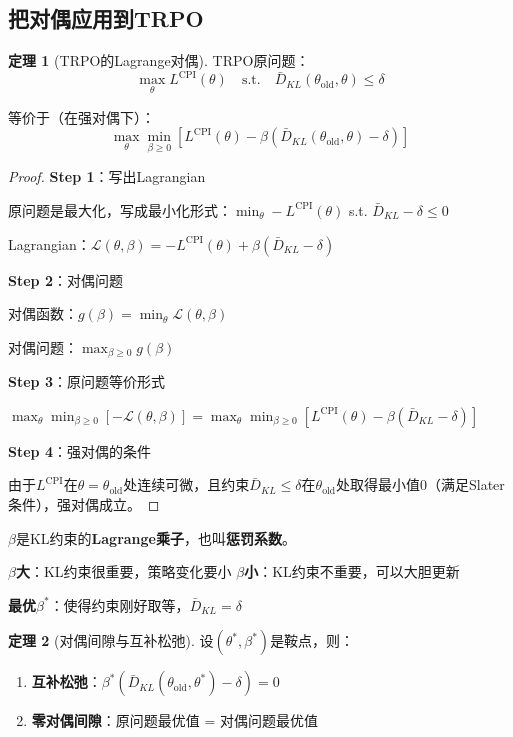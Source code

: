 \documentclass[11pt,a4paper]{article}
\theoremstyle{definition}
\newtheorem{theorem}{定理}[section]
\begin{document}
\subsection{把对偶应用到TRPO}

\begin{theorem}[TRPO的Lagrange对偶]
TRPO原问题：
\[
\max_\theta L^{\text{CPI}}(\theta) \quad \text{s.t.} \quad \bar{D}_{KL}(\theta_{\text{old}}, \theta) \leq \delta
\]

等价于（在强对偶下）：
\[
\max_\theta \min_{\beta \geq 0} \left[L^{\text{CPI}}(\theta) - \beta(\bar{D}_{KL}(\theta_{\text{old}}, \theta) - \delta)\right]
\]
\end{theorem}

\begin{proof}
\textbf{Step 1}：写出Lagrangian

原问题是最大化，写成最小化形式：$\min_\theta -L^{\text{CPI}}(\theta)$ s.t. $\bar{D}_{KL} - \delta \leq 0$

Lagrangian：$\mathcal{L}(\theta, \beta) = -L^{\text{CPI}}(\theta) + \beta(\bar{D}_{KL} - \delta)$

\textbf{Step 2}：对偶问题

对偶函数：$g(\beta) = \min_\theta \mathcal{L}(\theta, \beta)$

对偶问题：$\max_{\beta \geq 0} g(\beta)$

\textbf{Step 3}：原问题等价形式

$\max_\theta \min_{\beta \geq 0} [-\mathcal{L}(\theta, \beta)] = \max_\theta \min_{\beta \geq 0} [L^{\text{CPI}}(\theta) - \beta(\bar{D}_{KL} - \delta)]$

\textbf{Step 4}：强对偶的条件

由于$L^{\text{CPI}}$在$\theta = \theta_{\text{old}}$处连续可微，且约束$\bar{D}_{KL} \leq \delta$在$\theta_{\text{old}}$处取得最小值0（满足Slater条件），强对偶成立。
\end{proof}

\begin{keypoint}
$\beta$是KL约束的\textbf{Lagrange乘子}，也叫\textbf{惩罚系数}。

\textbf{$\beta$大}：KL约束很重要，策略变化要小
\textbf{$\beta$小}：KL约束不重要，可以大胆更新

\textbf{最优$\beta^*$}：使得约束刚好取等，$\bar{D}_{KL} = \delta$
\end{keypoint}

\begin{theorem}[对偶间隙与互补松弛]
设$(\theta^*, \beta^*)$是鞍点，则：
\begin{enumerate}
    \item \textbf{互补松弛}：$\beta^*(\bar{D}_{KL}(\theta_{\text{old}}, \theta^*) - \delta) = 0$
    \item \textbf{零对偶间隙}：原问题最优值 = 对偶问题最优值
\end{enumerate}
\end{theorem}
\end{document}
